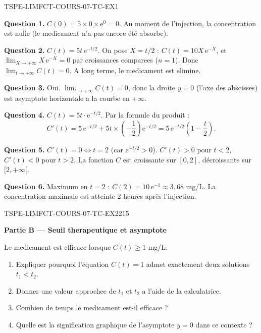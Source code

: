 \begin{corrige}{TSPE-LIMFCT-COURS-07-TC-EX1}


\textbf{Question 1.} $C(0) = 5 \times 0 \times \mathrm{e}^0 = 0$. Au moment de l'injection, la concentration est nulle (le medicament n'a pas encore été absorbe).

\textbf{Question 2.} $C(t) = 5t\,\mathrm{e}^{-t/2}$. On pose $X = t/2$ : $C(t) = 10X\,\mathrm{e}^{-X}$, et $\lim_{X \to +\infty} X\,\mathrm{e}^{-X} = 0$ par croissances comparees ($n = 1$). Donc $\lim_{t \to +\infty} C(t) = 0$. A long terme, le medicament est elimine.

\textbf{Question 3.} Oui. $\lim_{t \to +\infty} C(t) = 0$, donc la droite $y = 0$ (l'axe des abscisses) est asymptote horizontale a la courbe en $+\infty$.

\textbf{Question 4.} $C(t) = 5t \cdot \mathrm{e}^{-t/2}$. Par la formule du produit :
\[
  C'(t) = 5\,\mathrm{e}^{-t/2} + 5t \times \left(-\frac{1}{2}\right)\mathrm{e}^{-t/2} = 5\,\mathrm{e}^{-t/2}\left(1 - \frac{t}{2}\right).
\]

\textbf{Question 5.} $C'(t) = 0 \iff t = 2$ (car $\mathrm{e}^{-t/2} > 0$). $C'(t) > 0$ pour $t < 2$, $C'(t) < 0$ pour $t > 2$. La fonction $C$ est croissante sur $[0, 2]$, décroissante sur $[2, +\infty[$.

\textbf{Question 6.} Maximum en $t = 2$ : $C(2) = 10\,\mathrm{e}^{-1} \approx 3{,}68$ mg/L. La concentration maximale est atteinte 2 heures après l'injection.

\end{corrige}

\bigskip


\begin{exercice}{TSPE-LIMFCT-COURS-07-TC-EX2}{2}{15}

\textbf{Partie B — Seuil therapeutique et asymptote}

Le medicament est efficace lorsque $C(t) \geq 1$ mg/L.

\begin{enumerate}
  \item Expliquer pourquoi l'équation $C(t) = 1$ admet exactement deux solutions $t_1 < t_2$.
  \item Donner une valeur approchee de $t_1$ et $t_2$ a l'aide de la calculatrice.
  \item Combien de temps le medicament est-il efficace ?
  \item Quelle est la signification graphique de l'asymptote $y = 0$ dans ce contexte ?
\end{enumerate}

\end{exercice}

